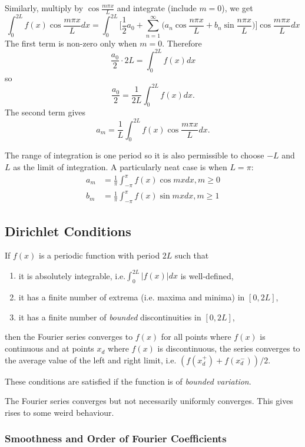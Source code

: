\documentclass[a4paper]{article}
\begin{document}
Similarly, multiply by $\cos \frac{m\pi x}{L}$ and integrate (include $m=0$), we get
\[
  \int_0^{2L} f(x)\cos\frac{m\pi x}{L} dx = \int_0^{2L} \Bigg[ \frac{1}{2}a_0 + \sum_{n=1}^\infty \Big(a_n\cos\frac{n\pi x}{L} +b_n\sin\frac{n\pi x}{L}\Big) \Bigg] \cos\frac{m\pi x}{L} dx
\]
The first term is non-zero only when $m=0$. Therefore
\[
  \frac{a_0}{2} \cdot 2L = \int_0^{2L} f(x) dx
\]
so
\[
\frac{a_0}{2} = \frac{1}{2L}\int_0^{2L} f(x) dx.
\]
The second term gives
\[
  a_m = \frac{1}{L} \int_0^{2L} f(x) \cos\frac{m\pi x}{L} dx.
\]

The range of integration is one period so it is also permissible to choose $-L$ and $L$ as the limit of integration. A particularly neat case is when $L=\pi$:
\begin{align*}
  a_m &= \frac{1}{\pi} \int_{-\pi}^\pi f(x) \cos mx dx, m\geq0 \\
  b_m &= \frac{1}{\pi} \int_{-\pi}^\pi f(x) \sin mx dx, m\geq1
\end{align*}

\subsection{Dirichlet Conditions}

If $f(x)$ is a periodic function with period $2L$ such that
\begin{enumerate}
\item it is absolutely integrable, i.e.$\int_0^{2L}|f(x)| dx$ is well-defined,
\item it has a finite number of extrema (i.e. maxima and minima) in $[0,2L]$,
  \item it has a finite number of \emph{bounded} discontinuities in $[0,2L]$,
\end{enumerate}
then the Fourier series converges to $f(x)$ for all points where $f(x)$ is continuous and at points $x_d$ where $f(x)$ is discontinuous, the series converges to the average value of the left and right limit, i.e. $(f(x_d^+)+f(x_d^-))/2$.

These conditions are satisfied if the function is of \emph{bounded variation}.

\begin{rmk}
  The Fourier series converges but not necessarily uniformly converges. This gives rises to some weird behaviour.
\end{rmk}

\subsubsection{Smoothness and Order of Fourier Coefficients}
\end{document}
